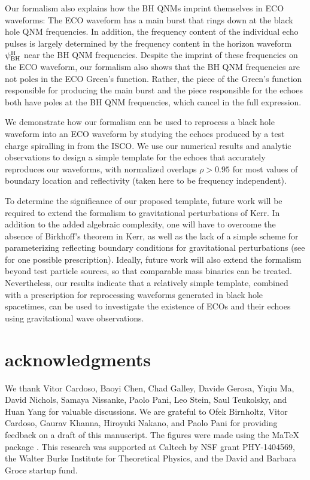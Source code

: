 \begin{refsection}
Our formalism also explains how the BH QNMs imprint themselves in ECO waveforms: The ECO waveform has a main burst that rings down at the black hole QNM frequencies. 
In addition, the frequency content of the individual echo pulses is largely determined by the frequency content in the horizon waveform $\psi^{\rm H}_{\rm BH}$ near the BH QNM frequencies.
Despite the imprint of these frequencies on the ECO waveform, our formalism also shows that the BH QNM frequencies are not poles in the ECO Green's function. Rather, the piece of the Green's function responsible for producing the main burst and the piece responsible for the echoes both have poles at the BH QNM frequencies, which cancel in the full expression. 

We demonstrate how our formalism can be used to reprocess a black hole waveform into an ECO waveform by studying the echoes produced by a test charge spiralling in from the ISCO. We use our numerical results and analytic observations to design a simple template for the echoes that accurately reproduces our waveforms, with normalized overlaps $\rho > 0.95$ for most values of boundary location and reflectivity (taken here to be frequency independent). 

To determine the significance of our proposed template, future work will be required to extend the formalism to gravitational perturbations of Kerr. 
In addition to the added algebraic complexity, one will have to overcome the absence of Birkhoff's theorem in Kerr, as well as the lack of a simple scheme for parameterizing reflecting boundary conditions for gravitational perturbations \cite{Price:2017cjr} (see \cite{Nakano:2017fvh} for one possible prescription). 
Ideally, future work will also extend the formalism beyond test particle sources, so that comparable mass binaries can be treated. 
Nevertheless, our results indicate that a relatively simple template, combined with a prescription for reprocessing waveforms generated in black hole spacetimes, can be used to investigate the existence of ECOs and their echoes using gravitational wave observations.

\section{acknowledgments}
We thank Vitor Cardoso, Baoyi Chen, Chad Galley, Davide Gerosa, Yiqiu Ma, David Nichols, Samaya Nissanke, Paolo Pani, Leo Stein, Saul Teukolsky, and Huan Yang for valuable discussions. 
We are grateful to Ofek Birnholtz, Vitor Cardoso, Gaurav Khanna, Hiroyuki Nakano, and Paolo Pani for providing feedback on a draft of this manuscript. The figures were made using the MaTeX package \cite{matex}. This research was supported at Caltech by NSF grant PHY-1404569, the Walter Burke Institute for Theoretical Physics, and the David and Barbara Groce startup fund.


\end{refsection}
